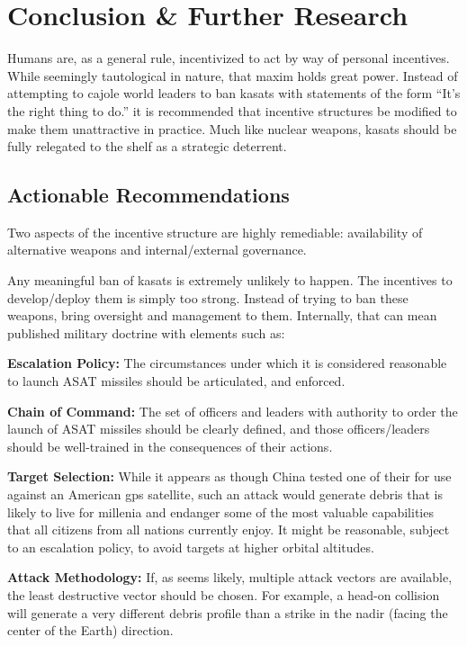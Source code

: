 \section{Conclusion \& Further Research}

Humans are, as a general rule, incentivized to act by way of personal
incentives.  While seemingly tautological in nature, that maxim holds
great power.  Instead of attempting to cajole world leaders to ban
\acp{kasat} with statements of the form ``It's the right thing to
do.'' it is recommended that incentive structures be modified to make
them unattractive in practice.  Much like nuclear weapons, \acp{kasat}
should be fully relegated to the shelf as a strategic deterrent.

\subsection{Actionable Recommendations}

Two aspects of the incentive structure are highly remediable:
availability of alternative weapons and internal/external governance.

Any meaningful ban of \acp{kasat} is extremely unlikely to happen.
The incentives to develop/deploy them is simply too strong.  Instead
of trying to ban these weapons, bring oversight and management to
them.  Internally, that can mean published military doctrine with
elements such as:

\textbf{Escalation Policy:} The circumstances under which it is
considered reasonable to launch ASAT missiles should be articulated,
and enforced.

\textbf{Chain of Command:} The set of officers and leaders with
authority to order the launch of ASAT missiles should be clearly
defined, and those officers/leaders should be well-trained in the
consequences of their actions.

\textbf{Target Selection:} While it appears as though China tested one
of their  for use against an American \ac{gps} satellite,
such an attack would generate debris that is likely to live for
millenia and endanger some of the most valuable capabilities that all
citizens from all nations currently enjoy.  It might be reasonable,
subject to an escalation policy, to avoid targets at higher orbital
altitudes.

\textbf{Attack Methodology:} If, as seems likely, multiple attack
vectors are available, the least destructive vector should be chosen.
For example, a head-on collision will generate a very different debris
profile than a strike in the nadir (facing the center of the Earth)
direction.

